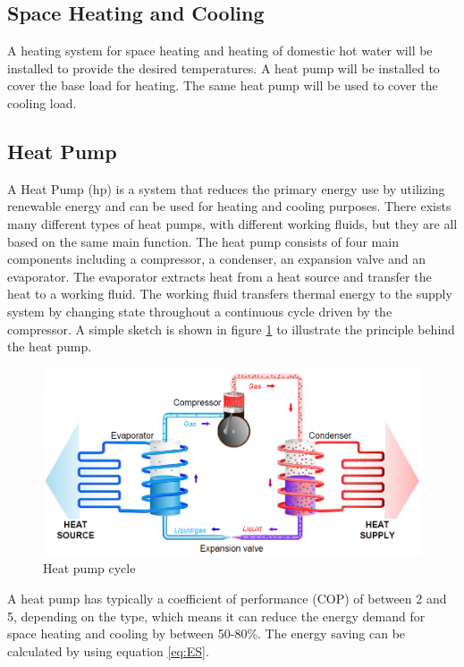 \subsection*{Space Heating and Cooling}
A heating system for space heating and heating of domestic hot water will be installed to provide the desired temperatures. A heat pump will be installed to cover the base load for heating. The same heat pump will be used to cover the cooling load. 

\subsection*{Heat Pump}
A Heat Pump (\ac{hp}) is a system that reduces the primary energy use by utilizing renewable energy and can be used for heating and cooling purposes. There exists many different types of heat pumps, with different working fluids, but they are all based on the same main function. The heat pump consists of four main components including a compressor, a condenser, an expansion valve and an evaporator. The evaporator extracts heat from a heat source and transfer the heat to a working fluid. The working fluid transfers thermal energy to the supply system by changing state throughout a continuous cycle driven by the compressor. A simple sketch is shown in figure \ref{fig:HP} to illustrate the principle behind the heat pump.

\begin{figure}[h!]
    \centering
    \includegraphics[scale=0.35]{vedlegg/HP.png}
    \caption{Heat pump cycle}
    \label{fig:HP}
\end{figure}

A heat pump has typically a coefficient of performance (\ac{COP}) of between 2 and 5, depending on the type, which means it can reduce the energy demand for space heating and cooling by between 50-80\%. The energy saving can be calculated by using equation \ref{eq:ES}.

